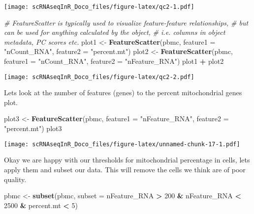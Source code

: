 \documentclass[
]{book}
\newenvironment{Shaded}{\begin{snugshade}}{\end{snugshade}}
\newcommand{\AttributeTok}[1]{\textcolor[rgb]{0.13,0.29,0.53}{#1}}
\newcommand{\CommentTok}[1]{\textcolor[rgb]{0.56,0.35,0.01}{\textit{#1}}}
\newcommand{\DecValTok}[1]{\textcolor[rgb]{0.00,0.00,0.81}{#1}}
\newcommand{\FunctionTok}[1]{\textcolor[rgb]{0.13,0.29,0.53}{\textbf{#1}}}
\newcommand{\NormalTok}[1]{#1}
\newcommand{\OtherTok}[1]{\textcolor[rgb]{0.56,0.35,0.01}{#1}}
\newcommand{\SpecialCharTok}[1]{\textcolor[rgb]{0.81,0.36,0.00}{\textbf{#1}}}
\newcommand{\StringTok}[1]{\textcolor[rgb]{0.31,0.60,0.02}{#1}}
\begin{document}
\texttt{[image: scRNAseqInR\_Doco\_files/figure-latex/qc2-1.pdf]}

\begin{Shaded}
\begin{Highlighting}[]
\CommentTok{\# FeatureScatter is typically used to visualize feature{-}feature relationships, }
\CommentTok{\# but can be used for anything calculated by the object, }
\CommentTok{\# i.e. columns in object metadata, PC scores etc.}
\NormalTok{plot1 }\OtherTok{\textless{}{-}} \FunctionTok{FeatureScatter}\NormalTok{(pbmc, }\AttributeTok{feature1 =} \StringTok{"nCount\_RNA"}\NormalTok{, }\AttributeTok{feature2 =} \StringTok{"percent.mt"}\NormalTok{) }
\NormalTok{plot2 }\OtherTok{\textless{}{-}} \FunctionTok{FeatureScatter}\NormalTok{(pbmc, }\AttributeTok{feature1 =} \StringTok{"nCount\_RNA"}\NormalTok{, }\AttributeTok{feature2 =} \StringTok{"nFeature\_RNA"}\NormalTok{) }
\NormalTok{plot1 }\SpecialCharTok{+}\NormalTok{ plot2}
\end{Highlighting}
\end{Shaded}

\texttt{[image: scRNAseqInR\_Doco\_files/figure-latex/qc2-2.pdf]}

Lets look at the number of features (genes) to the percent mitochondrial genes plot.

\begin{Shaded}
\begin{Highlighting}[]
\NormalTok{plot3 }\OtherTok{\textless{}{-}} \FunctionTok{FeatureScatter}\NormalTok{(pbmc, }\AttributeTok{feature1 =} \StringTok{"nFeature\_RNA"}\NormalTok{, }\AttributeTok{feature2 =} \StringTok{"percent.mt"}\NormalTok{) }
\NormalTok{plot3}
\end{Highlighting}
\end{Shaded}

\texttt{[image: scRNAseqInR\_Doco\_files/figure-latex/unnamed-chunk-17-1.pdf]}

Okay we are happy with our thresholds for mitochondrial percentage in cells, lets apply them and subset our data. This will remove the cells we think are of poor quality.

\begin{Shaded}
\begin{Highlighting}[]
\NormalTok{pbmc }\OtherTok{\textless{}{-}} \FunctionTok{subset}\NormalTok{(pbmc, }\AttributeTok{subset =}\NormalTok{ nFeature\_RNA }\SpecialCharTok{\textgreater{}} \DecValTok{200} \SpecialCharTok{\&}\NormalTok{ nFeature\_RNA }\SpecialCharTok{\textless{}} \DecValTok{2500} \SpecialCharTok{\&}\NormalTok{ percent.mt }\SpecialCharTok{\textless{}} \DecValTok{5}\NormalTok{)}
\end{Highlighting}
\end{Shaded}
\end{document}
